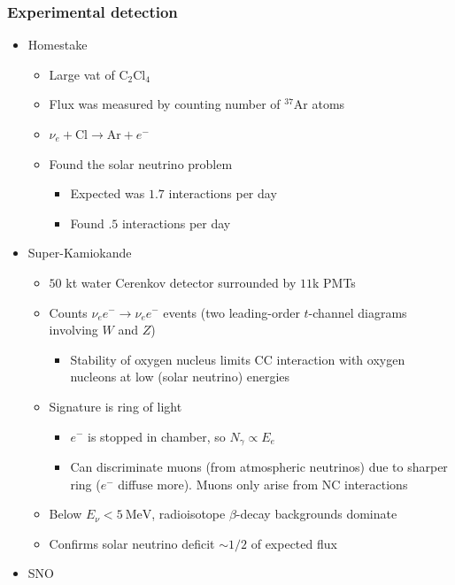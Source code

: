 \documentclass[11pt]{article}
\newcommand{\mev}{\text{MeV}}
\newcommand{\el}{\ensuremath{e^{-}}\xspace}
\begin{document}
\subsubsection{Experimental detection}
\begin{itemize}
  \item Homestake
  \begin{itemize}
    \item Large vat of $\text{C}_2\text{Cl}_4$
    \item Flux was measured by counting number of $^{37}\text{Ar}$ atoms
    \item $\nu_e+\text{Cl}\rightarrow \text{Ar}+\el$
    \item Found the solar neutrino problem
    \begin{itemize}
      \item Expected was $1.7$ interactions per day
      \item Found $.5$ interactions per day
    \end{itemize}
  \end{itemize}
  \item Super-Kamiokande
  \begin{itemize}
    \item $50$ kt water Cerenkov detector surrounded by $11$k PMTs
    \item Counts $\nu_e\el\rightarrow\nu_e\el$ events (two leading-order $t$-channel diagrams involving $W$ and $Z$)
    \begin{itemize}
      \item Stability of oxygen nucleus limits CC interaction with oxygen nucleons at low (solar neutrino) energies
    \end{itemize}
    \item Signature is ring of light
    \begin{itemize}
      \item $\el$ is stopped in chamber, so $N_\gamma \propto E_e$
      \item Can discriminate muons (from atmospheric neutrinos) due to sharper ring ($\el$ diffuse more). Muons only arise from NC interactions
    \end{itemize}
    \item Below $E_\nu < 5~\mev$, radioisotope $\beta$-decay backgrounds dominate
    \item Confirms solar neutrino deficit $\sim1/2$ of expected flux
  \end{itemize}
  \item SNO
  \begin{itemize}

\end{itemize}
\end{itemize}
\end{document}
